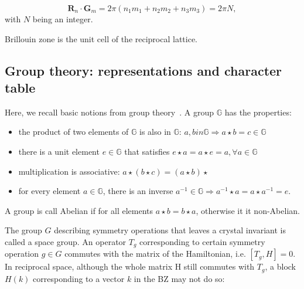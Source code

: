 \begin{equation}
\mathbf{R}_n \cdot \mathbf{G}_m = 2 \pi \left( n_1 m_1 + n_2 m_2 + n_3 m_3 \right) = 2 \pi N,
\end{equation}
with $N$ being an integer.

Brillouin zone  is the unit cell of the reciprocal lattice.




\subsection{Group theory: representations and character table}
Here, we recall basic notions from group theory~\cite{dresselhaus2007group}. A group $\mathbb{G}$ has the properties:
\begin{itemize}
\item the product of two elements of $\mathbb{G}$ is also in $\mathbb{G}$: $a, b 
in \mathbb{G} \Rightarrow a \star b = c \in \mathbb{G}$
\item there is a unit element $e \in \mathbb{G}$ that satisfies $e \star a = a \star e = a,  \forall a \in \mathbb{G}$
\item multiplication is associative: $a \star ( b \star c) = (a \star b) \star$
\item for every element $a \in \mathbb{G}$, there is an inverse $a^{-1} \in \mathbb{G} \Rightarrow a^{-1} \star a = a \star a^{-1} = e$.
\end{itemize}
A group is call Abelian if for all elements $a \star b = b \star a$, otherwise it it non-Abelian.

The group $G$ describing symmetry operations that leaves a crystal invariant is called a space group. An operator $T_g$ corresponding to certain symmetry operation $g \in G$ commutes with the matrix of the Hamiltonian, i.e. $[T_g,H] = 0$. In reciprocal space, although the whole matrix H still commutes with $T_g$, a block $ H(k)$ corresponding to a vector $k$ in the BZ may not do so:

